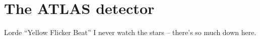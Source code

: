 \chapter{The  ATLAS detector}
\label{ch:atlas}
\begin{chapquote}{Lorde ``Yellow Flicker Beat''}
{I never watch the stars -- there's so much down here.}
\end{chapquote}



\def\figpath{figures/Undergrad thesis/}


\clearpage







\FloatBarrier
\clearpage

